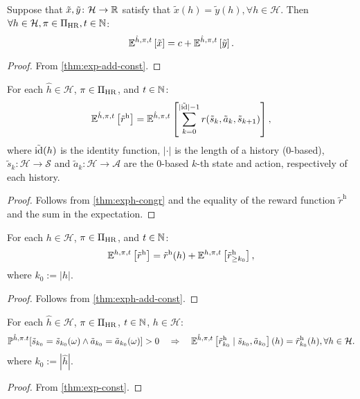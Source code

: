 \begin{theorem} \label{thm:exph-add-const}
Suppose that $\tilde{x}, \tilde{y} \colon \mathcal{H} \to \mathbb{R} $ satisfy that $\tilde{x}(h) = \tilde{y}(h), \forall h \in \mathcal{H}$. Then $\forall h\in \mathcal{H}, \pi\in \Pi_{\mathrm{HR}}, t \in \mathbb{N}$:
\[
  \mathbb{E}^{\hat{h}, \pi, t} \left[ \tilde{x} \right]
  =
  c + \mathbb{E}^{\hat{h}, \pi, t} \left[ \tilde{y} \right].
\]
\end{theorem}
\begin{proof}
From \cref{thm:exp-add-const}.
\end{proof}

\begin{theorem}\label{thm:expret-eq-sum-rew}
For each $\hat{h}\in \mathcal{H}$, $\pi \in \Pi_{\mathrm{HR}}$, and $t\in \mathbb{N}$:
\[
\mathbb{E}^{\hat{h}, \pi, t} \left[ \tilde{r}^{\mathrm{h}} \right]
=
\mathbb{E}^{\hat{h}, \pi, t} \left[ \sum_{k=0}^{|\tilde{\operatorname{id}}|-1}  r(\tilde{s}_k, \tilde{a}_k, \tilde{s}_{k+1}) \right],
\]
where $\tilde{\operatorname{id}}(h)$ is the identity function, $|\cdot|$ is the length of a history (0-based), $\tilde{s}_k\colon \mathcal{H} \to \mathcal{S}$ and $\tilde{a}_k\colon \mathcal{H} \to \mathcal{A}$ are the 0-based $k$-th state and action, respectively of each history.
 \leanok
\end{theorem}
\begin{proof}
Follows from \cref{thm:exph-congr} and the equality of the reward function $\tilde{r}^{\mathrm{h}}$ and the sum in the expectation.
\end{proof}

\begin{theorem}\label{thm:sum-rew-eq-sum-rew-rg}
For each $h\in \mathcal{H}$, $\pi \in \Pi_{\mathrm{HR}}$, and $t\in \mathbb{N}$:
\[
\mathbb{E}^{h, \pi, t} \left[  \tilde{r}^{\mathrm{h}} \right]
=
\tilde{r}^{\mathrm{h}}(h) + \mathbb{E}^{h, \pi, t} \left[ \tilde{r}^{\mathrm{h}}_{\ge k_0} \right],
\]
where $k_0:=|h|$.
\end{theorem}
\begin{proof}
Follows from \cref{thm:exph-add-const}.
\end{proof}

\begin{theorem}\label{thm:sum-rew-cnd}
For each $\hat{h}\in \mathcal{H}$, $\pi \in \Pi_{\mathrm{HR}}$, $t\in \mathbb{N}$, $h\in \mathcal{H}$:
\begin{equation*}
  \mathbb{P}^{\hat{h},\pi.t}[\tilde{s}_{k_0}=\tilde{s}_{k_0}(\omega) \wedge \tilde{a}_{k_0} = \tilde{a}_{k_0}(\omega) ] > 0
\quad\Rightarrow \quad
  \mathbb{E}^{\hat{h}, \pi, t} \left[ \tilde{r}^{\mathrm{h}}_{k_0} \mid  \tilde{s}_{k_0}, \tilde{a}_{k_0}\right](h) = \tilde{r}^{\mathrm{h}}_{k_0}(h), \forall h \in \mathcal{H}.
\end{equation*}
where $k_0:= |\hat{h}|$.
\end{theorem}
\begin{proof}
 From \cref{thm:exp-const}. 
\end{proof}

